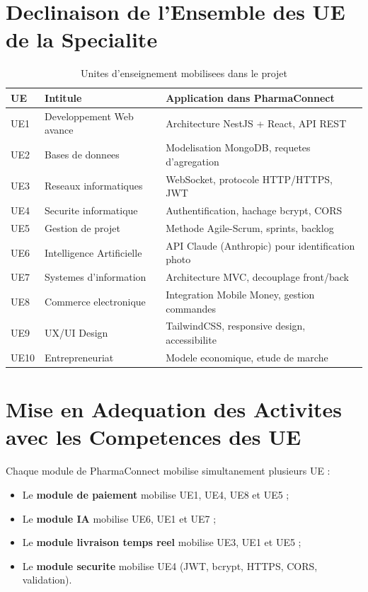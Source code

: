 \documentclass[12pt,a4paper]{report}
\begin{document}
\section{Declinaison de l'Ensemble des UE de la Specialite}

\begin{table}[ht]
\centering
\caption{Unites d'enseignement mobilisees dans le projet}
\renewcommand{\arraystretch}{1.4}
\begin{tabularx}{\textwidth}{|l|X|X|}
\hline
\rowcolor{vertpharma!20}
\textbf{UE} & \textbf{Intitule} & \textbf{Application dans PharmaConnect} \\ \hline
UE1 & Developpement Web avance & Architecture NestJS + React, API REST \\ \hline
UE2 & Bases de donnees & Modelisation MongoDB, requetes d'agregation \\ \hline
UE3 & Reseaux informatiques & WebSocket, protocole HTTP/HTTPS, JWT \\ \hline
UE4 & Securite informatique & Authentification, hachage bcrypt, CORS \\ \hline
UE5 & Gestion de projet & Methode Agile-Scrum, sprints, backlog \\ \hline
UE6 & Intelligence Artificielle & API Claude (Anthropic) pour identification photo \\ \hline
UE7 & Systemes d'information & Architecture MVC, decouplage front/back \\ \hline
UE8 & Commerce electronique & Integration Mobile Money, gestion commandes \\ \hline
UE9 & UX/UI Design & TailwindCSS, responsive design, accessibilite \\ \hline
UE10 & Entrepreneuriat & Modele economique, etude de marche \\ \hline
\end{tabularx}
\end{table}

\section{Mise en Adequation des Activites avec les Competences des UE}

Chaque module de PharmaConnect mobilise simultanement plusieurs UE :

\begin{itemize}[label=\textcolor{vertpharma}{\textbullet}]
    \item Le \textbf{module de paiement} mobilise UE1, UE4, UE8 et UE5 ;
    \item Le \textbf{module IA} mobilise UE6, UE1 et UE7 ;
    \item Le \textbf{module livraison temps reel} mobilise UE3, UE1 et UE5 ;
    \item Le \textbf{module securite} mobilise UE4 (JWT, bcrypt, HTTPS, CORS, validation).
\end{itemize}
\end{document}
